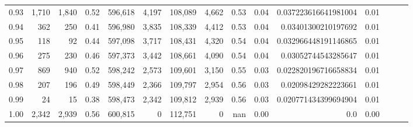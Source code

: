 \begin{tabular}{rrrrrrrrrrrrrrr}
0.93 &   1,710 &  1,840 &  0.52 &  596,618 &    4,197 &  108,089 &    4,662 &  0.53 &  0.04 &  0.037223616641981004 &      0.01 \\
0.94 &     362 &    250 &  0.41 &  596,980 &    3,835 &  108,339 &    4,412 &  0.53 &  0.04 &   0.03401300210197692 &      0.01 \\
0.95 &     118 &     92 &  0.44 &  597,098 &    3,717 &  108,431 &    4,320 &  0.54 &  0.04 &  0.032966448191146865 &      0.01 \\
0.96 &     275 &    230 &  0.46 &  597,373 &    3,442 &  108,661 &    4,090 &  0.54 &  0.04 &   0.03052744543285647 &      0.01 \\
0.97 &     869 &    940 &  0.52 &  598,242 &    2,573 &  109,601 &    3,150 &  0.55 &  0.03 &  0.022820196716658834 &      0.01 \\
0.98 &     207 &    196 &  0.49 &  598,449 &    2,366 &  109,797 &    2,954 &  0.56 &  0.03 &   0.02098429282223661 &      0.01 \\
0.99 &      24 &     15 &  0.38 &  598,473 &    2,342 &  109,812 &    2,939 &  0.56 &  0.03 &  0.020771434399694904 &      0.01 \\
1.00 &   2,342 &  2,939 &  0.56 &  600,815 &        0 &  112,751 &        0 &   nan &  0.00 &                   0.0 &      0.00 \\
\bottomrule
\end{tabular}
